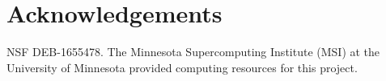 \documentclass[11pt]{article}
\begin{document}
\clearpage



\clearpage





\section{Acknowledgements}

NSF DEB-1655478.
The Minnesota Supercomputing Institute (MSI) at the University of Minnesota provided computing resources for this project.


\clearpage


\setstretch{\stretchby}
\end{document}

